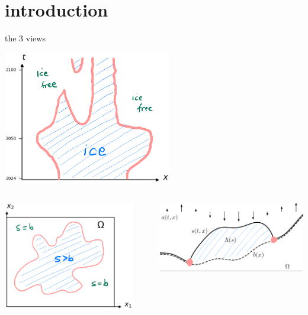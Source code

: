 \documentclass[10pt,dvipsnames]{beamer}
\begin{document}
\section{introduction}

\begin{frame}{the 3 views}

\vspace{-2mm}
\begin{center}
\includegraphics[width=0.55\textwidth]{xtcrop}
\end{center}

\vspace{-2mm}
\begin{columns}
\begin{column}{0.43\textwidth}
\includegraphics[width=0.9\textwidth]{mapplane}
\end{column}
\begin{column}{0.57\textwidth}
\hfill \includegraphics[width=\textwidth]{stokesdomainpink}
\end{column}
\end{columns}
\end{frame}
\end{document}
